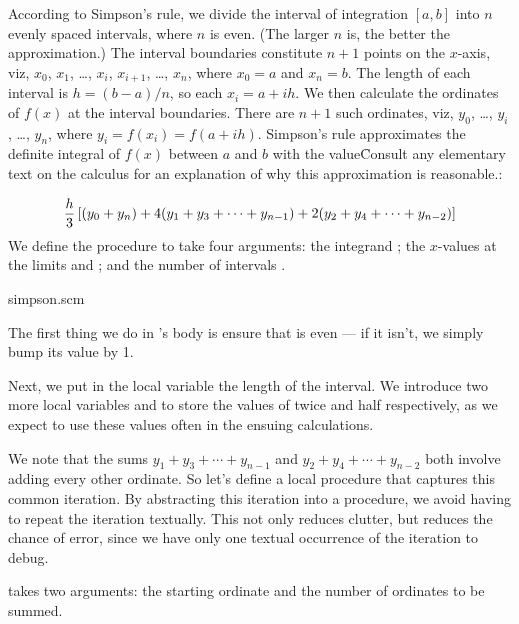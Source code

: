 According to Simpson's rule, we divide 
the interval of integration $[a,b]$ 
into $n$ evenly spaced
intervals, where $n$ is even. (The larger $n$
is, the better the approximation.)
The interval boundaries constitute
$n+1$ points on the $x$-axis, viz, $x_0$, $x_1$,
\dots, $x_i$, $x_{i+1}$, \dots, $x_n$, where
$x_0 = a$ and $x_n = b$.
The length of each
interval is $h = (b - a)/n$, so each $x_i = a+ih$.   We then
calculate the ordinates of $f(x)$ at the interval
boundaries.  There are $n+1$ such ordinates, viz,
$y_0$, \dots, $y_i$, \dots, $y_n$, where  $y_i = f(x_i)
= f(a+ih)$.
Simpson's rule
approximates the definite integral of $f(x)$ between
$a$ and $b$ with the value\f{Consult any elementary
text on the calculus for an explanation of why this
approximation is reasonable.}:

$$
{h\over 3} \left[ (y_0 + y_n) 
+ 4(y_1 + y_3 + \cdots + y_{n-1}) 
+ 2(y_2 + y_4 + \cdots + y_{n-2}) \right]
$$
%
We define
the procedure 
to take four arguments: the integrand ; the
$x$-values at the limits  and ; and the
number of intervals .  

\scmfilename simpson.scm

\n The first thing we do in
's body is ensure that
 is even --- if it isn't, we simply bump its
value by 1.  


\n Next, we put in the local variable 
the length of the interval.  We introduce two more local variables
 and  to store the values of twice 
and half  respectively, as we expect to
use these values often in the ensuing calculations.


\n We note that the sums $y_1 + y_3 + \cdots + y_{n-1}$
and $y_2 + y_4 + \cdots + y_{n-2}$ both involve adding
every other ordinate. So let's define a local procedure
 that
captures this common iteration.  By abstracting this
iteration into a procedure, we avoid having to repeat
the iteration textually.  This not only reduces
clutter, but reduces the chance of error, since we have
only one textual occurrence of the iteration to debug.

 takes two arguments:
the starting ordinate and the number of ordinates to be summed.

